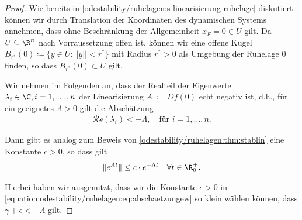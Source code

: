 \documentclass[letterpaper,10pt,german]{jupyterBook}
\begin{document}
\begin{proof}
 Wie bereits in \cref{odestability/ruhelagen:s-linearisierung-ruhelage}  diskutiert können wir durch Translation der Koordinaten des dynamischen Systems annehmen, dass ohne Beschränkung der Allgemeinheit \(x_F = 0 \in U\) gilt.
Da \(U\subseteq\R^n\) nach Vorraussetzung offen ist, können wir eine offene Kugel \(B_{{r^\ast}}(0) \coloneqq \{y \in U \colon ||y|| < {r^\ast}\}\) mit Radius \({r^\ast} > 0\) als Umgebung der Ruhelage \(0\) finden, so dass \(B_{r^\ast}(0) \subset U\) gilt.

\par
Wir nehmen im Folgenden an, dass der Realteil der Eigenwerte \(\lambda_i \in \C, i=1,\ldots,n\) der Linearisierung \(A \, \coloneqq \, Df(0)\) echt negativ ist, d.h., für ein geeignetes \(\Lambda > 0\) gilt die Abschätzung
\begin{align*}
\mathcal{Re}(\lambda_i)< -\Lambda, \quad \text{für } i=1,\ldots,n.\end{align*}
\par
Dann gibt es analog zum Beweis von \cref{odestability/ruhelagen:thm:stablin} eine Konstante \(c>0\), so dass gilt
\begin{align}\label{equation:odestability/ruhelagen:eq:normexp}
\|e^{At}\| \leq c\cdot e^{-\Lambda t}\quad \forall t\in \R^+_0.
\end{align}
\par
Hierbei haben wir ausgenutzt, dass wir die Konstante \(\epsilon > 0\) in \eqref{equation:odestability/ruhelagen:eq:abschaetzungew} so klein wählen können, dass \(\gamma + \epsilon < -\Lambda\) gilt.


\end{proof}
\end{document}
